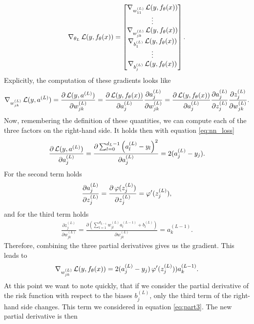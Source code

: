 \begin{align*}
\nabla_{\theta_{L}} \operatorname{\mathcal{L}}(y, f_{\theta}(x)) = \left[\begin{matrix}
\nabla_{w^{(L)}_{11}} \operatorname{\mathcal{L}}(y, f_{\theta}(x))\\
\vdots\\
\nabla_{w^{(L)}_{jk}} \operatorname{\mathcal{L}}(y, f_{\theta}(x))\\
\nabla_{b^{(L)}_{1}} \operatorname{\mathcal{L}}(y, f_{\theta}(x))\\
\vdots\\
\nabla_{b^{(L)}_{j}} \operatorname{\mathcal{L}}(y, f_{\theta}(x))
\end{matrix} \right].
\end{align*}
Explicitly, the computation of these gradients looks like
\begin{align*}
\nabla_{w^{(L)}_{jk}} \operatorname{\mathcal{L}}(y, a^{(L)}) = \frac{\partial \operatorname{\mathcal{L}}(y, a^{(L)})}{\partial w^{(L)}_{jk}} = \frac{\partial \operatorname{\mathcal{L}}(y, f_{\theta}(x))}{\partial a_{j}^{(L)}} \frac{\partial a_{j}^{(L)}}{\partial w^{(L)}_{jk}} = \frac{\partial \operatorname{\mathcal{L}}(y, f_{\theta}(x))}{\partial a_{j}^{(L)}} \frac{\partial a_{j}^{(L)}}{\partial z_{j}^{(L)}} \frac{\partial z_{j}^{(L)}}{\partial w^{(L)}_{jk}}.
\end{align*}
Now, remembering the definition of these quantities, we can compute each of the three factors on the right-hand side. It holds then with equation \eqref{eq:nn_loss}
\begin{align}\label{eq:part1}
\frac{\partial \operatorname{\mathcal{L}}(y, a^{(L)})}{\partial a_{j}^{(L)}} = \frac{\partial \sum_{l=0}^{d_L-1} \left(a_{l}^{(L)} - y_l \right)^2}{\partial a_{j}^{(L)}} = 2(a_{j}^{(L)} - y_j).
\end{align}
For the second term holds
\begin{align}\label{eq:part2}
\frac{\partial a_{j}^{(L)}}{\partial z_{j}^{(L)}} = \frac{\partial \operatorname{\varphi}(z_{j}^{(L)})}{\partial z_{j}^{(L)}} = \operatorname{\varphi}^{\prime} (z_{j}^{(L)}),
\end{align}
and for the third term holds
\begin{align}\label{eq:part3}
\frac{\partial z_{j}^{(L)}}{\partial w^{(L)}_{jk}} = \frac{\partial \left(\sum_{l=1}^{d_{L-1}} w^{(L)}_{jl} a_{l}^{(L-1)} + b_l^{(L)}\right)}{\partial w^{(L)}_{jk}} = a_{k}^{(L-1)}.
\end{align}
Therefore, combining the three partial derivatives gives us the gradient. This leads to
\begin{align*}
\nabla_{w^{(L)}_{jk}} \operatorname{\mathcal{L}}(y, f_{\theta}(x)) = 2(a_{j}^{(L)} - y_j) \operatorname{\varphi}^{\prime} (z_{j}^{(L)})) a_{k}^{(L-1)}.
\end{align*}
At this point we want to note quickly, that if we consider the partial derivative of the risk function with respect to the biases $b_{j}^{(L)}$, only the third term of the right-hand side changes. This term we considered in equation \eqref{eq:part3}. The new partial derivative is then
